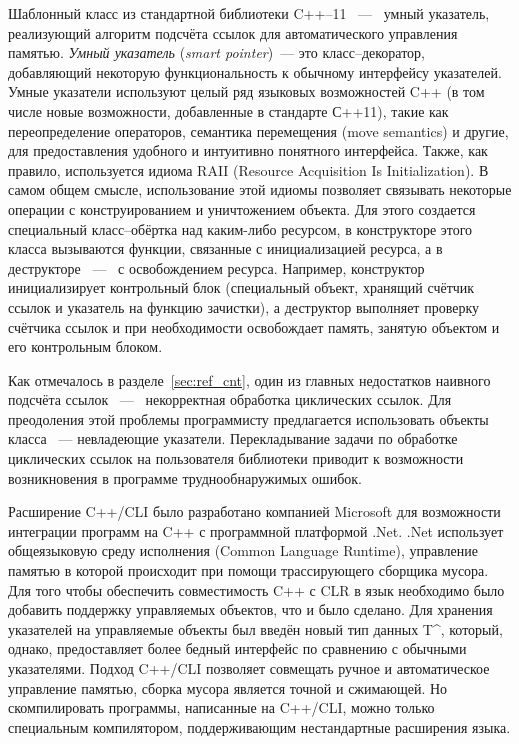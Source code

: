 Шаблонный класс  из стандартной библиотеки C++--11
~---~ умный указатель, реализующий алгоритм подсчёта ссылок для автоматического управления 
памятью. 
\emph{Умный указатель} (\emph{smart pointer})~--- это класс--декоратор, добавляющий некоторую 
функциональность к обычному интерфейсу указателей. Умные указатели используют целый ряд 
языковых возможностей C++ (в том числе новые возможности, добавленные в стандарте С++11), 
такие как переопределение операторов, семантика перемещения (move semantics) и другие, 
для предоставления удобного и интуитивно понятного интерфейса. 
Также, как правило, используется идиома RAII (Resource Acquisition Is Initialization). 
В самом общем смысле, использование этой идиомы позволяет связывать некоторые операции с 
конструированием и уничтожением объекта. 
Для этого создается специальный класс--обёртка над каким-либо ресурсом, в конструкторе этого 
класса вызываются функции, связанные с инициализацией ресурса, а в деструкторе ~---~ с 
освобождением ресурса. 
Например, конструктор  инициализирует контрольный блок (специальный 
объект, хранящий счётчик ссылок и указатель на функцию зачистки), а деструктор выполняет 
проверку счётчика ссылок и при необходимости освобождает память, занятую объектом и его 
контрольным блоком.

Как отмечалось в разделе~\ref{sec:ref_cnt}, один из главных недостатков наивного подсчёта 
ссылок ~---~ некорректная обработка циклических ссылок. 
Для преодоления этой проблемы программисту предлагается использовать объекты класса 
~--- невладеющие указатели. 
Перекладывание задачи по обработке циклических ссылок на пользователя библиотеки приводит 
к возможности возникновения в программе труднообнаружимых ошибок.

Расширение C++/CLI было разработано компанией Microsoft для возможности интеграции программ 
на C++ с программной платформой .Net. .Net использует общеязыковую среду исполнения 
(Common Language Runtime), управление памятью в которой происходит при помощи трассирующего 
сборщика мусора. 
Для того чтобы обеспечить совместимость C++ с CLR в язык необходимо было добавить поддержку 
управляемых объектов, что и было сделано. 
Для хранения указателей на управляемые объекты был введён новый тип данных 
T\textasciicircum, который, однако, предоставляет более бедный интерфейс по сравнению с 
обычными указателями. 
Подход C++/CLI позволяет совмещать ручное и автоматическое управление памятью, сборка 
мусора является точной и сжимающей. Но скомпилировать программы, написанные на C++/CLI, 
можно только специальным компилятором, поддерживающим нестандартные расширения языка.

